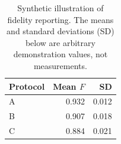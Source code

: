 \begin{table}
\caption{Synthetic illustration of fidelity reporting. The means and standard
 deviations (SD) below are arbitrary demonstration values, not measurements.}
\label{tab:synthetic}
\begin{ruledtabular}
\begin{tabular}{lrr}
Protocol & Mean $F$ & SD \\
\hline
A & 0.932 & 0.012 \\
B & 0.907 & 0.018 \\
C & 0.884 & 0.021 \\
\end{tabular}
\end{ruledtabular}
\end{table}
